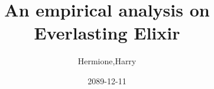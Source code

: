 \documentclass[10pt,conference,twoside]{IEEEtran}
\begin{document}
\title{An empirical analysis on Everlasting Elixir}
\author{Hermione,Harry}
\date{2089-12-11}
\maketitle


\end{document}
